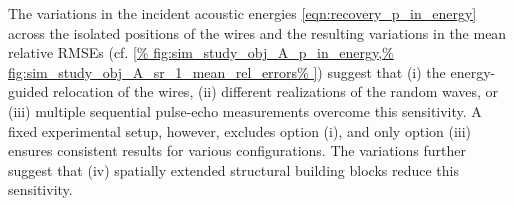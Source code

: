 The variations in
the incident acoustic energies
\eqref{eqn:recovery_p_in_energy} across
the isolated positions of
the wires and
the resulting variations in
the mean relative \acp{RMSE}
(cf. \cref{%
  fig:sim_study_obj_A_p_in_energy,%
  fig:sim_study_obj_A_sr_1_mean_rel_errors%
}) suggest that
(i) the energy-guided relocation of
the wires,
(ii) different realizations of
the random waves, or
(iii) multiple sequential pulse-echo measurements overcome
this sensitivity.
A fixed experimental setup, however, excludes
option (i), and
only option (iii) ensures
consistent results for
various configurations.
The variations further suggest that
(iv) spatially extended structural building blocks reduce
this sensitivity.

